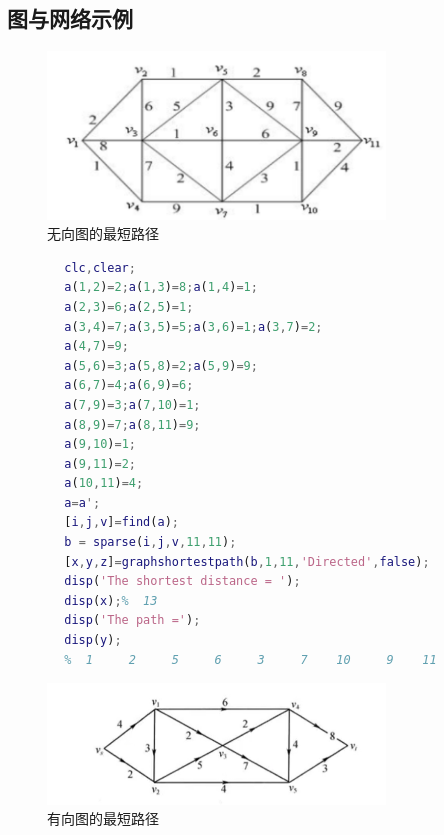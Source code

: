 \documentclass[a4paper,20pt]{article}
\begin{document}
\subsection{图与网络示例}
\begin{figure}[H]
    {
        \centering
        \includegraphics[width=0.8\textwidth]{figure2.png}
        \caption{无向图的最短路径}
    }
\end{figure}
\begin{center}
    \begin{lstlisting}[caption={Example1.m},language=Matlab]
        %This is example1.m
        clc,clear;
        a(1,2)=2;a(1,3)=8;a(1,4)=1;
        a(2,3)=6;a(2,5)=1;
        a(3,4)=7;a(3,5)=5;a(3,6)=1;a(3,7)=2;
        a(4,7)=9;
        a(5,6)=3;a(5,8)=2;a(5,9)=9;
        a(6,7)=4;a(6,9)=6;
        a(7,9)=3;a(7,10)=1;
        a(8,9)=7;a(8,11)=9;
        a(9,10)=1;
        a(9,11)=2;
        a(10,11)=4;
        a=a';
        [i,j,v]=find(a);
        b = sparse(i,j,v,11,11);
        [x,y,z]=graphshortestpath(b,1,11,'Directed',false);
        disp('The shortest distance = ');
        disp(x);%  13
        disp('The path =');
        disp(y);
        %  1     2     5     6     3     7    10     9    11
        \end{lstlisting}
\end{center}
\begin{figure}[h]
    \begin{center}
        \includegraphics[width=0.80\textwidth]{figure3.png}
        \caption{有向图的最短路径}
    \end{center}
\end{figure}
\end{document}
